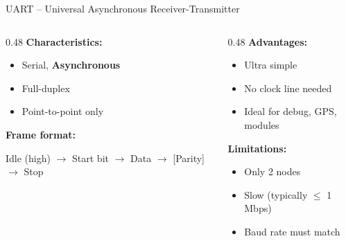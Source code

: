\documentclass[aspectratio=169,11pt]{beamer}
\begin{document}
\begin{frame}{UART -- Universal Asynchronous Receiver-Transmitter}
    \begin{columns}[T]
        \begin{column}{0.48\textwidth}
            \textbf{Characteristics:}
            \begin{itemize}
                \item Serial, \textbf{Asynchronous}
                \item Full-duplex
                \item Point-to-point only
            \end{itemize}
            
            \vspace{0.3cm}
            \textbf{Frame format:}
            
            Idle (high) $\rightarrow$ Start bit $\rightarrow$ Data $\rightarrow$ [Parity] $\rightarrow$ Stop
        \end{column}
        \begin{column}{0.48\textwidth}
            \textbf{Advantages:}
            \begin{itemize}
                \item Ultra simple
                \item No clock line needed
                \item Ideal for debug, GPS, modules
            \end{itemize}
            
            \vspace{0.3cm}
            \textbf{Limitations:}
            \begin{itemize}
                \item Only 2 nodes
                \item Slow (typically $\leq$ 1 Mbps)
                \item Baud rate must match
            \end{itemize}
        \end{column}
    \end{columns}
    
    \vspace{0.3cm}
    \footnotesize
    \cite{white2011making}
\end{frame}
\end{document}
